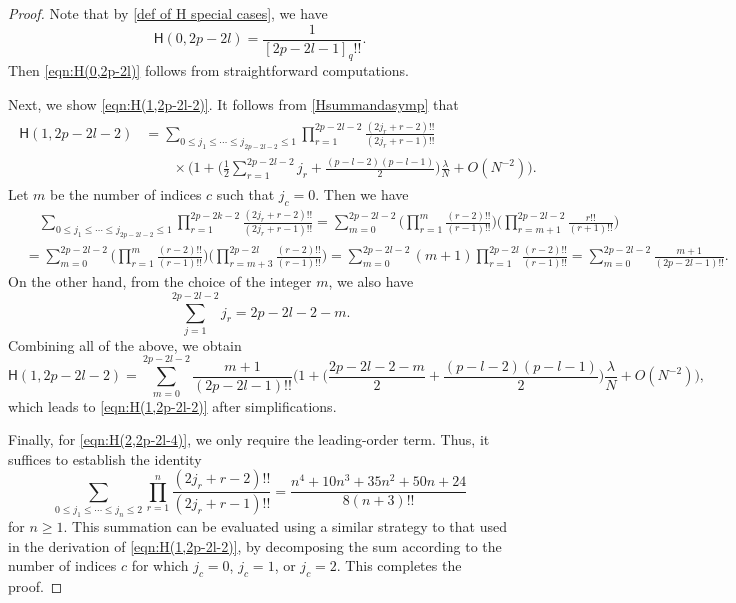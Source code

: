 \documentclass{amsart}
\theoremstyle{plain}
\theoremstyle{remark}
\numberwithin{equation}{section}
\begin{document}
\begin{proof}
    Note that by \eqref{def of H special cases}, we have
    \begin{equation*}
        \mathsf{H}(0,2p-2l)=\frac{1}{[2p-2l-1]_{q}!!}.
    \end{equation*}
    Then \eqref{eqn:H(0,2p-2l)} follows from straightforward computations. 
    
    Next, we show  \eqref{eqn:H(1,2p-2l-2)}. 
    It follows from \eqref{Hsummandasymp} that
    \begin{align}
    \begin{split}
    \label{eqn:asymptotic of H(1,2p-2l-2)}
        \mathsf{H}(1,2p-2l-2)&=\sum_{0\leq j_{1}{\leq}\cdots{\leq}j_{2p-2l-2}\leq1}
        \prod_{r=1}^{2p-2l-2}\frac{(2j_{r}+r-2)!!}{(2j_{r}+r-1)!!}
        \\
        &\qquad \times \bigg(1+\Big(\frac{1}{2}\sum_{r=1}^{2p-2l-2}j_r +\frac{(p-l-2)(p-l-1)}{2}\Big)\frac{\lambda}{N}+O(N^{-2})\bigg).
    \end{split}
    \end{align} 
    Let $m$ be the number of indices $c$ such that $j_c=0$. Then we have
    \begin{align*}
        &\quad \sum_{0\leq j_{1}{\leq} \cdots{\leq}j_{2p-2l-2}\leq1}\prod_{r=1}^{2p-2k-2}\frac{(2j_{r}+r-2)!!}{(2j_{r}+r-1)!!}
        =\sum_{m=0}^{2p-2l-2}
        \Big(\prod_{r=1}^{m}\frac{(r-2)!!}{(r-1)!!}\Big)
        \Big(\prod_{r=m+1}^{2p-2l-2}\frac{r!!}{(r+1)!!}\Big)
        \\
        &=\sum_{m=0}^{2p-2l-2}
        \Big(\prod_{r=1}^{m}\frac{(r-2)!!}{(r-1)!!}\Big)
        \Big(\prod_{r=m+3}^{2p-2l}\frac{(r-2)!!}{(r-1)!!}\Big)= \sum_{m=0}^{2p-2l-2} (m+1)\prod_{r=1}^{2p-2l}\frac{(r-2)!!}{(r-1)!!} =  \sum_{m=0}^{2p-2l-2}  \frac{m+1}{(2p-2l-1)!!}. 
    \end{align*} 
    On the other hand, from the choice of the integer $m$, we also have
    \begin{equation*}
        \sum_{j=1}^{2p-2l-2}j_{r}=2p-2l-2-m. 
    \end{equation*}
    Combining all of the above, we obtain 
    \begin{equation*}
        \mathsf{H}(1,2p-2l-2)
        =\sum_{m=0}^{2p-2l-2}\frac{m+1}{(2p-2l-1)!!}\bigg(1+\Big(\frac{2p-2l-2-m}{2}+\frac{(p-l-2)(p-l-1)}{2}\Big)\frac{\lambda}{N}+O(N^{-2})\bigg),
    \end{equation*}
    which leads to \eqref{eqn:H(1,2p-2l-2)} after simplifications. 
    
   Finally, for \eqref{eqn:H(2,2p-2l-4)}, we only require the leading-order term. Thus, it suffices to establish the identity
    \begin{equation}
        \sum_{0\leq j_1\leq\cdots\leq j_{n}\leq 2}\prod_{r=1}^{n}\frac{(2j_r +r-2)!!}{(2j_r +r-1)!!}=\frac{n^4+10n^3+35n^2+50n+24}{8(n+3)!!}
    \end{equation}
    for $n\geq1$. This summation can be evaluated using a similar strategy to that used in the derivation of \eqref{eqn:H(1,2p-2l-2)}, by decomposing the sum according to the number of indices \( c \) for which \( j_c = 0 \), \( j_c = 1 \), or \( j_c = 2 \). This completes the proof. 
\end{proof}
\end{document}
